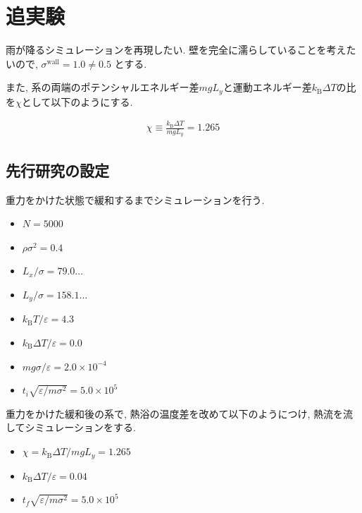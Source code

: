 \documentclass[dvipdfmx]{jsarticle}
\numberwithin{equation}{subsection}
\begin{document}

\newpage

\section{追実験}

雨が降るシミュレーションを再現したい. 壁を完全に濡らしていることを考えたいので, $\sigma^{\text{wall}}=1.0\neq 0.5$ とする.

また, 系の両端のポテンシャルエネルギー差$mgL_y$と運動エネルギー差$k_{\text{B}}\Delta T$の比を$\chi$として以下のようにする.

\begin{align}
  \chi \equiv \frac{k_{\text{B}}\Delta T}{mgL_{y}} = 1.265
\end{align}

\subsection{先行研究の設定}

重力をかけた状態で緩和するまでシミュレーションを行う.

\begin{itemize}
  \item $N = 5000$
  \item $\rho \sigma^2 = 0.4$
  \item $L_x / \sigma = 79.0\dots$
  \item $L_y / \sigma = 158.1\dots$
  \item $k_{\text{B}} T/\varepsilon = 4.3$
  \item $k_{\text{B}} \Delta T/\varepsilon = 0.0$
  \item $mg\sigma/\varepsilon = 2.0 \times 10^{-4}$
  \item $t_i \sqrt{\varepsilon / m \sigma^2} = 5.0 \times 10^{5}$
\end{itemize}

重力をかけた緩和後の系で, 熱浴の温度差を改めて以下のようにつけ, 熱流を流してシミュレーションをする.

\begin{itemize}
  \item $\chi = k_{\text{B}}\Delta T / mg L_y = 1.265$
  \item $k_{\text{B}} \Delta T/\varepsilon = 0.04$
  \item $t_f \sqrt{\varepsilon / m \sigma^2} = 5.0 \times 10^{5}$
\end{itemize}
\end{document}
